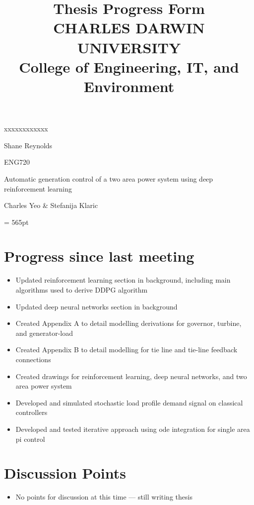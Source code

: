 \documentclass[12pt]{article}
\title{	
		Thesis Progress Form\\
		CHARLES DARWIN UNIVERSITY\\
		College of Engineering, IT, and Environment
	  }
\author{}
\date{}
\begin{document}
	
	\maketitle
	
	\begin{namelist}{xxxxxxxxxxxx}
		\item[{\bf Name:}]
			Shane Reynolds
		\item[{\bf Unit:}]
			ENG720
		\item[{\bf Title:}]
			Automatic generation control of a two area power system using deep reinforcement learning
		\item[{\bf Supervisors:}]
			Charles Yeo \& Stefanija Klaric
		\item[{\bf Time \& Date:} \today \ @ 2.30pm]
			
	\end{namelist}
	
	\pagestyle{plain} %
	\textheight = 565pt %
	
	\section{Progress since last meeting}
	\begin{itemize}
		\item Updated reinforcement learning section in background, including main algorithms used to derive DDPG algorithm
		\item Updated deep neural networks section in background
		\item Created Appendix A to detail modelling derivations for governor, turbine, and generator-load
		\item Created Appendix B to detail modelling for tie line and tie-line feedback connections
		\item Created drawings for reinforcement learning, deep neural networks, and two area power system
		\item Developed and simulated stochastic load profile demand signal on classical controllers
		\item Developed and tested iterative approach using ode integration for single area pi control
	\end{itemize}
	\section{Discussion Points}
	\begin{itemize}
		\item No points for discussion at this time --- still writing thesis
	\end{itemize}
\end{document}
